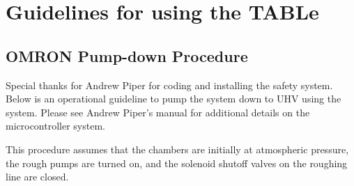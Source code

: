 \chapter{Guidelines for using the TABLe}
\label{appendix:TABLe_manual}

\section{OMRON Pump-down Procedure}

Special thanks for Andrew Piper for coding and installing the \OMRON safety system. Below is an operational guideline to pump the system down to UHV using the \OMRON system. Please see Andrew Piper's \OMRON manual for additional details on the microcontroller system.

This procedure assumes that the chambers are initially at atmospheric pressure, the rough pumps are turned on, and the solenoid shutoff valves on the roughing line are closed.

